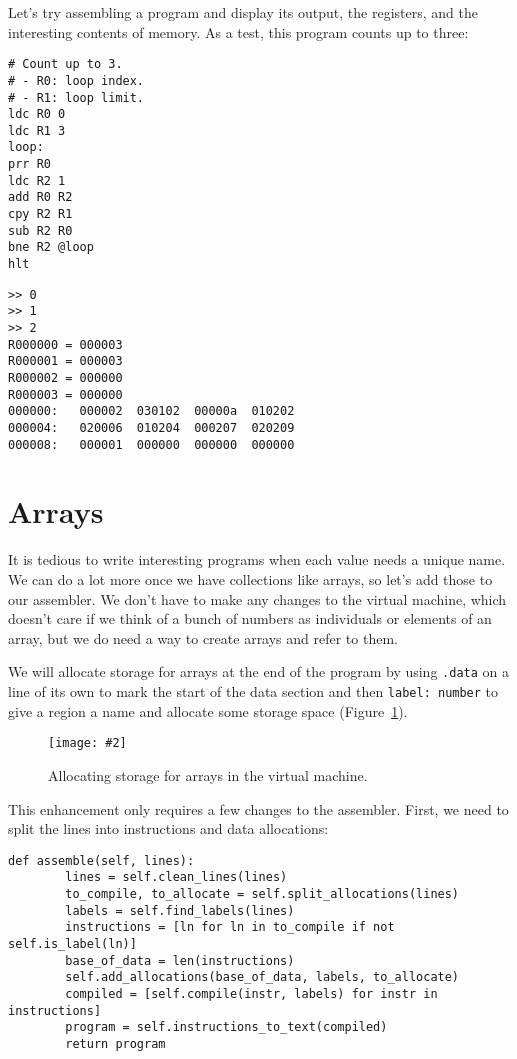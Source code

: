 \documentclass{scrbook}
\newcommand{\figref}[1]{Figure~\ref{#1}}
\newcommand{\figpdf}[4]{\begin{figure}%
\centering%
\texttt{[image: \#2]}%
\caption{#3}%
\label{#1}%
\end{figure}}
\begin{document}
Let's try assembling a program and display its output,
the registers,
and the interesting contents of memory.
As a test,
this program counts up to three:


\begin{lstlisting}[frame=single,frameround=tttt]
# Count up to 3.
# - R0: loop index.
# - R1: loop limit.
ldc R0 0
ldc R1 3
loop:
prr R0
ldc R2 1
add R0 R2
cpy R2 R1
sub R2 R0
bne R2 @loop
hlt
\end{lstlisting}



\begin{lstlisting}[frame=single,frameround=tttt]
>> 0
>> 1
>> 2
R000000 = 000003
R000001 = 000003
R000002 = 000000
R000003 = 000000
000000:   000002  030102  00000a  010202
000004:   020006  010204  000207  020209
000008:   000001  000000  000000  000000
\end{lstlisting}


\section*{Arrays}


It is tedious to write interesting programs when each value needs a unique name.
We can do a lot more once we have collections like arrays,
so let's add those to our assembler.
We don't have to make any changes to the virtual machine,
which doesn't care if we think of a bunch of numbers as individuals or elements of an array,
but we do need a way to create arrays and refer to them.


We will allocate storage for arrays at the end of the program
by using \texttt{.data} on a line of its own to mark the start of the data section
and then \texttt{label: number} to give a region a name and allocate some storage space
(\figref{vm-storage-allocation}).

\figpdf{vm-storage-allocation}{./vm/storage_allocation.pdf}{Allocating storage for arrays in the virtual machine.}{0.6}


This enhancement only requires a few changes to the assembler.
First,
we need to split the lines into instructions and data allocations:


\begin{lstlisting}[frame=single,frameround=tttt]
    def assemble(self, lines):
        lines = self.clean_lines(lines)
        to_compile, to_allocate = self.split_allocations(lines)
        labels = self.find_labels(lines)
        instructions = [ln for ln in to_compile if not self.is_label(ln)]
        base_of_data = len(instructions)
        self.add_allocations(base_of_data, labels, to_allocate)
        compiled = [self.compile(instr, labels) for instr in instructions]
        program = self.instructions_to_text(compiled)
        return program
\end{lstlisting}
\end{document}
